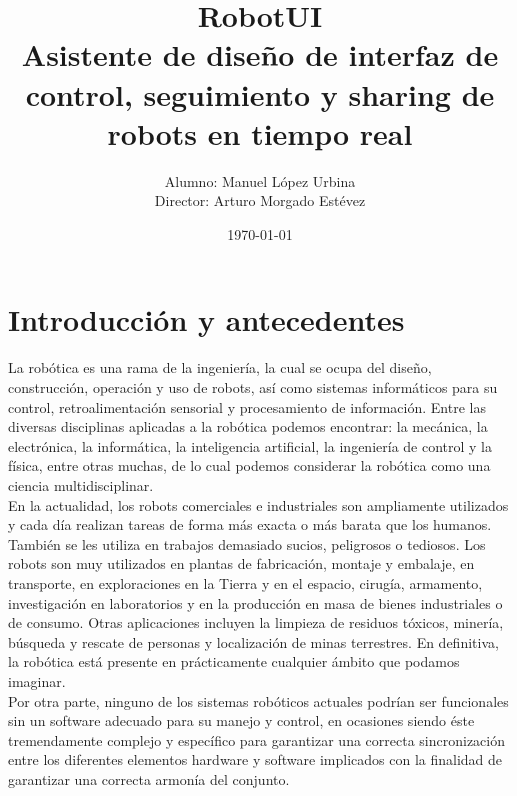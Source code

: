 \documentclass[a4paper,12pt]{article}
\title{RobotUI\\ Asistente de diseño de interfaz de control, seguimiento y sharing de robots en tiempo real }
\author{Alumno: Manuel López Urbina\\Director: Arturo Morgado Estévez}
\date{\today}
\begin{document}


\maketitle
\pagestyle{empty}
\tableofcontents 

\cleardoublepage
\pagestyle{plain}

\section{Introducción y antecedentes}

La robótica es una rama de la ingeniería, la cual se ocupa del diseño, construcción, operación y uso de robots, así como sistemas informáticos para su control, retroalimentación sensorial y procesamiento de información. Entre las diversas disciplinas aplicadas
a la robótica podemos encontrar: la mecánica, la electrónica, la informática, la inteligencia artificial, la ingeniería de control y la física, entre otras muchas, de lo cual podemos considerar 
la robótica como una ciencia multidisciplinar.\\

En la actualidad, los robots comerciales e industriales son ampliamente utilizados y cada día realizan tareas de forma más exacta o más barata que los humanos. También se les utiliza en trabajos demasiado sucios,
peligrosos o tediosos. Los robots son muy utilizados en plantas de fabricación, montaje y embalaje, en transporte, en exploraciones en la Tierra y en el espacio, cirugía, armamento, investigación en laboratorios y 
en la producción en masa de bienes industriales o de consumo. Otras aplicaciones incluyen la limpieza de residuos tóxicos, minería, búsqueda y rescate de personas y localización de minas terrestres. En definitiva, 
la robótica está presente en prácticamente cualquier ámbito que podamos imaginar.\\

Por otra parte, ninguno de los sistemas robóticos actuales podrían ser funcionales sin un software adecuado para su manejo y control, en ocasiones siendo éste tremendamente complejo y específico para garantizar
una correcta sincronización entre los diferentes elementos hardware y software implicados con la finalidad de garantizar una correcta armonía del conjunto.\\
\end{document}
